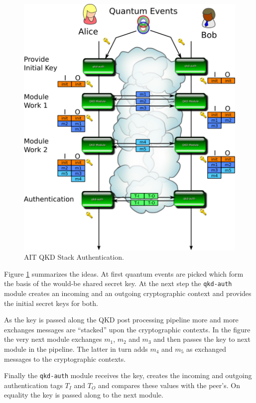 \begin{figure}[h]
    \centering
    \includegraphics{./gfx/qkd-stack-authentication.png}
    \caption{AIT QKD Stack Authentication.}
    \label{fig:qkd-stack-authentication}
\end{figure}

Figure \ref{fig:qkd-stack-authentication} summarizes the ideas. At first quantum events are picked which form the basis of the would-be shared secret key. At the next step the \texttt{qkd-auth} module creates an incoming and an outgoing cryptographic context and provides the initial secret keys for both.

\medskip

As the key is passed along the QKD post processing pipeline more and more exchanges messages are ``stacked'' upon the cryptographic contexts. In the figure the very next module exchanges $m_1$, $m_2$ and $m_3$ and then passes the key to next module in the pipeline. The latter in turn adds $m_4$ and $m_5$ as exchanged messages to the cryptographic contexts.

\medskip

Finally the \texttt{qkd-auth} module receives the key, creates the incoming and outgoing authentication tags $T_I$ and $T_O$ and compares these values with the peer's. On equality the key is passed along to the next module.


